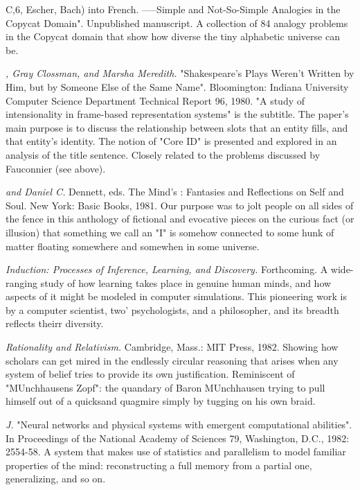 C,6, Escher, Bach) into French. -----Simple and Not-So-Simple Analogies in the Copycat Domain". Unpublished manuscript. A collection of 84 analogy problems in the Copycat domain that show how diverse the tiny alphabetic universe can be.

 {\sl , Gray Clossman, and Marsha Meredith.} "Shakespeare's Plays Weren't Written by Him, but by Someone Else of the Same Name". Bloomington: Indiana University Computer Science Department Technical Report 96, 1980. "A study of intensionality in frame-based representation systems" is the subtitle. The paper's main purpose is to discuss the relationship between slots that an entity fills, and that entity's identity. The notion of "Core ID" is presented and explored in an analysis of the title sentence. Closely related to the problems discussed by Fauconnier (see above).

 {\sl and Daniel C.} Dennett, eds. The Mind's : Fantasies and Reflections on Self and Soul. New York: Basic Books, 1981. Our purpose was to jolt people on all sides of the fence in this anthology of fictional and evocative pieces on the curious fact (or illusion) that something we call an "I" is somehow connected to some hunk of matter floating somewhere and somewhen in some universe.

 {\sl Induction: Processes of Inference, Learning, and Discovery.} Forthcoming. A wide-ranging study of how learning takes place in genuine human minds, and how aspects of it might be modeled in computer simulations. This pioneering work is by a computer scientist, two' psychologists, and a philosopher, and its breadth reflects theirr diversity.

 {\sl Rationality and Relativism.} Cambridge, Mass.: MIT Press, 1982. Showing how scholars can get mired in the endlessly circular reasoning that arises when any system of belief tries to provide its own justification. Reminiscent of "MUnchhausens Zopf": the quandary of Baron MUnchhausen trying to pull himself out of a quicksand quagmire simply by tugging on his own braid.

 {\sl J.} "Neural networks and physical systems with emergent computational abilities". In Proceedings of the National Academy of Sciences 79, Washington, D.C., 1982: 2554-58. A system that makes use of statistics and parallelism to model familiar properties of the mind: reconstructing a full memory from a partial one, generalizing, and so on.

